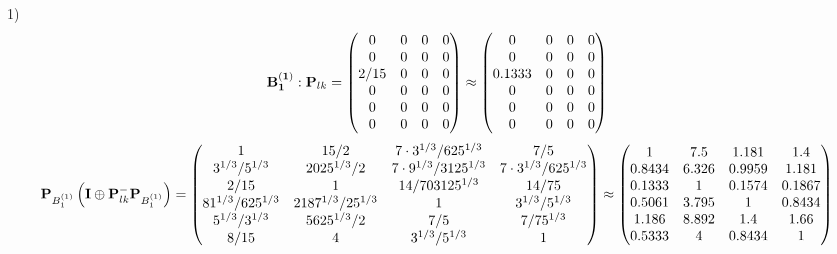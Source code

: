\documentclass[10pt,a4paper]{article}
\begin{document}
	1)
	\[
		\bold{B_1^{(1)}}: \bold{P}_{lk} = 
		\begin{pmatrix}
			{{0}}{} & {{0}}{} & {{0}}{} & {{0}}{} \\
			{{0}}{} & {{0}}{} & {{0}}{} & {{0}}{} \\
			{{2}} / {{15}} & {{0}}{} & {{0}}{} & {{0}}{} \\
			{{0}}{} & {{0}}{} & {{0}}{} & {{0}}{} \\
			{{0}}{} & {{0}}{} & {{0}}{} & {{0}}{} \\
			{{0}}{} & {{0}}{} & {{0}}{} & {{0}}{} \\
		\end{pmatrix}
		\approx
		\begin{pmatrix}
			0        & 0        & 0        & 0        \\
			0        & 0        & 0        & 0        \\
			0.1333   & 0        & 0        & 0        \\
			0        & 0        & 0        & 0        \\
			0        & 0        & 0        & 0        \\
			0        & 0        & 0        & 0        \\
		\end{pmatrix}
	\]
	\[
		\bold{P}_{B_1^{(1)}}\left(\bold{I} \oplus \bold{P}_{lk}^{-}\bold{P}_{B_1^{(1)}}\right) = 
		\begin{pmatrix}
			{1}{} & {{15}} / {{2}} & {{7} \cdot {3^ {1 / 3}}} / {{625^ {1 / 3}}} & {{7}} / {{5}} \\
			{{3^ {1 / 3}}} / {{5^ {1 / 3}}} & {{2025^ {1 / 3}}} / {{2}} & {{7} \cdot {9^ {1 / 3}}} / {{3125^ {1 / 3}}} & {{7} \cdot {3^ {1 / 3}}} / {{625^ {1 / 3}}} \\
			{{2}} / {{15}} & {1}{} & {{14}} / {{703125^ {1 / 3}}} & {{14}} / {{75}} \\
			{{81^ {1 / 3}}} / {{625^ {1 / 3}}} & {{2187^ {1 / 3}}} / {{2}{5^ {1 / 3}}} & {1}{} & {{3^ {1 / 3}}} / {{5^ {1 / 3}}} \\
			{{5^ {1 / 3}}} / {{3^ {1 / 3}}} & {{5625^ {1 / 3}}} / {{2}} & {{7}} / {{5}} & {{7}} / {{75^ {1 / 3}}} \\
			{{8}} / {{15}} & {{4}}{} & {{3^ {1 / 3}}} / {{5^ {1 / 3}}} & {1}{} \\
		\end{pmatrix}
		\approx
		\begin{pmatrix}
			1        & 7.5      & 1.181    & 1.4      \\
			0.8434   & 6.326    & 0.9959   & 1.181    \\
			0.1333   & 1        & 0.1574   & 0.1867   \\
			0.5061   & 3.795    & 1        & 0.8434   \\
			1.186    & 8.892    & 1.4      & 1.66     \\
			0.5333   & 4        & 0.8434   & 1        \\
		\end{pmatrix}
	\]
\end{document}
